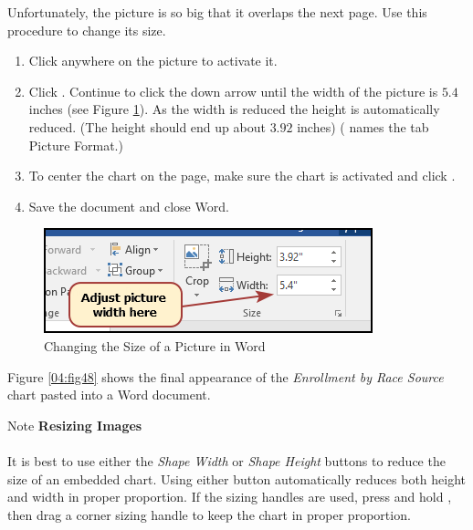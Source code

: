 Unfortunately, the picture is so big that it overlaps the next page. Use this procedure to change its size.

\begin{enumbox}
	\begin{enumerate}
		\item Click anywhere on the picture to activate it.
		\item Click . Continue to click the down arrow until the width of the picture is $ 5.4 $ inches (see Figure \ref{04:fig47}). As the width is reduced the height is automatically reduced. (The height should end up about $ 3.92 $ inches) ( names the tab Picture Format.)
		\item To center the chart on the page, make sure the chart is activated and click . 
		\item Save the document and close Word.
	\end{enumerate}
\end{enumbox}
	
\begin{figure}[H]
	\centering
	\includegraphics[width=\maxwidth{.75\linewidth}]{gfx/ch04_fig47}
	\caption{Changing the Size of a Picture in Word}
	\label{04:fig47}
\end{figure}

Figure \ref{04:fig48} shows the final appearance of the \textit{Enrollment by Race Source} chart pasted into a Word document. 

\begin{center}
	\begin{infobox}{Note}
		\textbf{Resizing Images}
		\\
		\\
		It is best to use either the \textit{Shape Width} or \textit{Shape Height} buttons to reduce the size of an embedded chart. Using either button automatically reduces both height and width in proper proportion. If the sizing handles are used, press and hold , then drag a corner sizing handle to keep the chart in proper proportion.
	\end{infobox}
\end{center}

